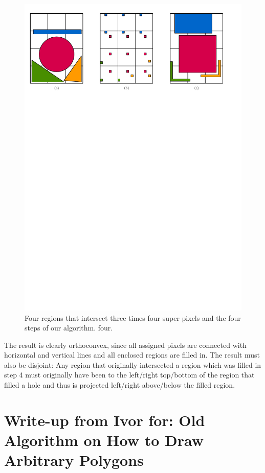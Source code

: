 \documentclass[a4paper,UKenglish,cleveref]{lipics-v2019}
\begin{document}
\begin{figure}[H]
\centering
\includegraphics[width=\textwidth]{Figures/convexprojection.pdf}
\caption{Four regions that intersect three times four super pixels and the four steps of our algorithm. four.}
\label{fig:convexprojection}
\end{figure}

The result is clearly orthoconvex, since all assigned pixels are connected with horizontal and vertical lines and all enclosed regions are filled in. The result must also be disjoint: Any region that originally intersected a region which was filled in step 4 must originally have been to the left/right top/bottom of the region that filled a hole and thus is projected left/right above/below the filled region.



\section{Write-up from Ivor for: Old Algorithm on How to Draw Arbitrary Polygons}
\end{document}
